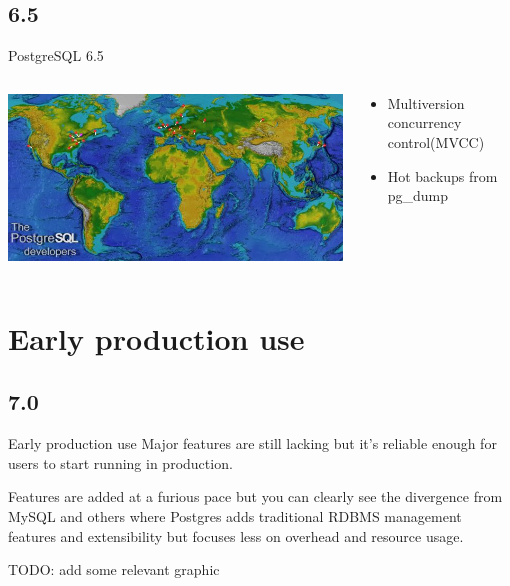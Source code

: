\documentclass[t,10pt]{beamer}
\begin{document}
\subsection{6.5}
\begin{frame}{PostgreSQL 6.5}
  \begin{columns}[T]
    \begin{column}{0.3\textwidth}
      \includegraphics[width=1.1\textwidth,keepaspectratio=true]{assets/history-007.png}
    \end{column}
    \begin{column}{0.7\textwidth}
      \begin{itemize}%
      \item Multiversion concurrency control(MVCC)
      \item Hot backups from pg\_dump
      \end{itemize}
    \end{column}
  \end{columns}
\end{frame}


\section{Early production use}

\subsection{7.0}
\begin{frame}{Early production use}
  Major features are still lacking but it's reliable enough for users
  to start running in production.

  Features are added at a furious pace but you can clearly see the
  divergence from MySQL and others where Postgres adds traditional
  RDBMS management features and extensibility but focuses less on
  overhead and resource usage.

  TODO: add some relevant graphic
\end{frame}
  
\end{document}

